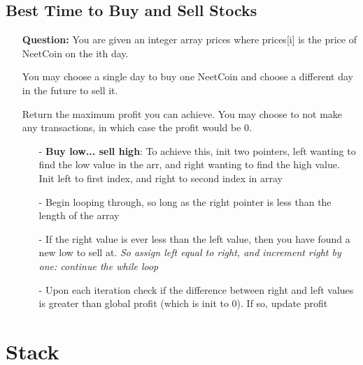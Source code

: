 \documentclass[12pt]{article}
\begin{document}
\subsection{Best Time to Buy and Sell Stocks}
\begin{enumerate}
  \item[] \textbf{Question:} You are given an integer array prices where prices[i] is the price of NeetCoin on the ith day.

You may choose a single day to buy one NeetCoin and choose a different day in the future to sell it.

Return the maximum profit you can achieve. You may choose to not make any transactions, in which case the profit would be 0.
    \begin{enumerate}
      \item[-] \textbf{Buy low... sell high}: To achieve this, init two pointers, left wanting to find the low value in the arr, and right wanting to find the high value. Init left to first index, and right to second index in array
      \item[-] Begin looping through, so long as the right pointer is less than the length of the array
      \item[-] If the right value is ever less than the left value, then you have found a new low to sell at. \textit{So assign left equal to right, and increment right by one: continue the while loop}
      \item[-] Upon each iteration check if the difference between right and left values is greater than global profit (which is init to 0). If so, update profit 
    \end{enumerate}
\end{enumerate}

\section{Stack}
\end{document}
